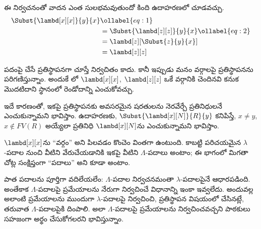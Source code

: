 \documentclass[../../../include/open-logic-section]{subfiles}
\begin{document}
ఈ నిర్వచనంతో వాదన ఎంత సులభమవుతుందో కింది ఉదాహరణలో చూడవచ్చు.
\begin{align}
  \Subst{\lambd[x][x]}{y}{x} &\ollabel{eq:1}\\
  &= \Subst{\lambd[z][z]}{y}{x} \ollabel{eq:2}\\
  &= \lambd[z][\Subst{z}{y}{x}] \\
  &= \lambd[z][z]
\end{align}

పదంపై చేసే ప్రతిస్థాపనగా చూస్తే 
నిర్వచితం కాదు. కానీ ఇప్పుడు మనం వర్గాలపై ప్రతిస్థాపనను
పరిగణిస్తున్నాం. అందుకే లో
$\lambd[x][x]$, $\lambd[z][z]$ ఒకే వర్గానికి చెందినవి
కనుక మొదటిదాని స్థానంలో రెండోదాన్ని ఎంచుకోవచ్చు.

ఇదే కారణంతో, ఇకపై ప్రతిస్థాపనకు అవసరమైన షరతులను నెరవేర్చే
ప్రతినిధులనే ఎంచుకున్నామని భావిస్తాం. ఉదాహరణకు,
$\Subst{\lambd[x][N]}{R}{y}$ కనిపిస్తే,
$x \neq y$, $x \notin FV(R)$ అయ్యేలా ప్రతినిధి
$\lambd[x][N]$ను ఎంచుకున్నామని భావిస్తాం.

$\lambd[x][x]$ను “వర్గం” అని పిలవడం కొంచెం వింతగా
ఉంటుంది. కాబట్టి పరిచయమైన $\lambda$-పదాల నుంచి వీటిని
వేరుచేయడానికి ఇకపై వీటిని $\Lambda$-పదాలు అంటాం;
ఈ భాగంలో మిగతా చోట్ల సంక్షిప్తంగా “పదాలు” అని కూడా అంటాం.

\begin{editorial}
  పాత పదాలను పూర్తిగా వదిలేయలేం: $\Lambda$-పదాల
  నిర్వచనమంతా $\lambda$-పదాలపైనే ఆధారపడింది. అంతేకాక
  $\Lambda$-పదాలపై ప్రమేయాలను నేరుగా నిర్వచించే విధానాన్ని
  ఇంకా ఇవ్వలేదు. అందువల్ల అలాంటి ప్రమేయాలను ముందుగా
  $\lambda$-పదాలపై నిర్వచించి, ప్రతిస్థాపన విషయంలో చేసినట్లే,
  తరువాత $\Lambda$-పదాలపైకి దింపాలి. అలా $\Lambda$-పదాలపై
  ప్రమేయాలను నిర్వచించవచ్చని పాఠకులు సహజంగా అర్థం చేసుకోగలరని భావిస్తున్నాం.
\end{editorial}
\end{document}

